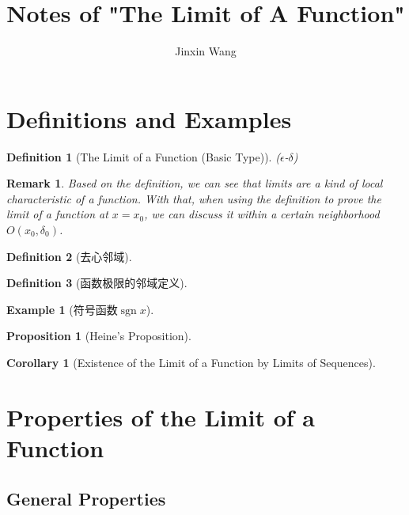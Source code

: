 \documentclass[onecolumn]{ctexart}
\title{Notes of "The Limit of A Function"}
\author{Jinxin Wang}
\date{}
\newtheorem{definition}{Definition}
\newtheorem{proposition}{Proposition}
\newtheorem{corollary}{Corollary}
\newtheorem{remark}{Remark}
\newtheorem{example}{Example}
\DeclareMathOperator{\sgn}{sgn}
\begin{document}
\maketitle

\section{Definitions and Examples}

\begin{definition}[The Limit of a Function (Basic Type)]
  ($\epsilon$-$\delta$)
\end{definition}

\begin{remark}
  Based on the definition, we can see that limits are a kind of local 
  characteristic of a function. With that, when using the definition to prove 
  the limit of a function at $x = x_0$, we can discuss it within a certain 
  neighborhood $O(x_0, \delta_0)$.
\end{remark}

\begin{definition}[去心邻域]
  
\end{definition}

\begin{definition}[函数极限的邻域定义]
  
\end{definition}

\begin{example}[符号函数$\sgn x$]
  
\end{example}

\begin{proposition}[Heine's Proposition]
  
\end{proposition}

\begin{corollary}[Existence of the Limit of a Function by Limits of Sequences]
  
\end{corollary}

\section{Properties of the Limit of a Function}

\subsection{General Properties}
\end{document}
